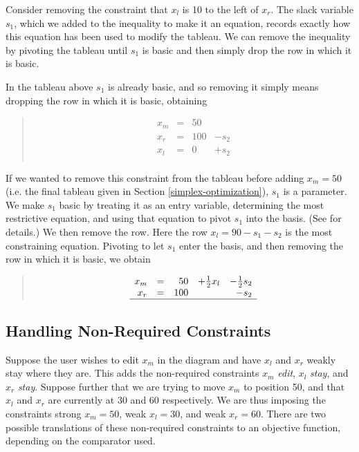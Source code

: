 \documentclass{uist96}
\newcommand{\strength}{\rm}
\begin{document}
Consider removing the constraint that $x_l$ is 10 to the left of $x_r$.
The slack variable $s_1$, which we added to the inequality to make it
an equation, records exactly how this equation has been used to modify the
tableau.  We can remove the inequality by pivoting the tableau until 
$s_1$ is basic and then simply drop the row in which it is basic.

In the tableau above $s_1$ is already basic, and so removing it simply means
dropping the row in which it is basic, obtaining
\begin{quote}\vspace*{-1ex}
$$
\begin{array}{rlrrr} 
x_m & = &50   \\
x_r & = &100 & - s_2 \\ \hline
x_l & = &0 & + s_2 \\

\end{array}
$$
\end{quote}\vspace{-0.9ex}

If we wanted to remove this constraint
from the tableau before adding $x_m = 50$ (i.e. the final tableau given in
Section \ref{simplex-optimization}), $s_1$ is a parameter.
We make $s_1$ basic by treating it as an entry variable,
determining the most restrictive equation, and using that equation
to pivot $s_1$ into the basis.
(See \cite{borning-simplex-tr} for details.)
We then remove the row.  Here
the row $x_l  = 90  - s_1  - s_2$
is the most constraining equation. 
Pivoting to let $s_1$ enter the
basis, and then removing the row in which it is basic, we obtain
\begin{quote}\vspace*{-1ex}
$$
\begin{array}{rlrrr} 
x_m & = &50 & + \frac{1}{2} x_l & - \frac{1}{2} s_2 \\
x_r & = &100 &  & - s_2 \\ \hline
\end{array}
$$
\end{quote}\vspace{-0.9ex}

\subsection{Handling Non-Required Constraints}
\label{non-requireds}

Suppose the user wishes to edit $x_m$ in the diagram and have $x_l$ and
$x_r$ weakly stay where they are.  This adds the non-required constraints
$x_m$ {\em edit}, $x_l$ {\em stay}, and $x_r$ {\em stay}.  Suppose further
that we are trying to move $x_m$ to position 50, and that $x_l$ and $x_r$ are
currently at 30 and 60 respectively.  We are thus imposing the constraints
{\strength strong} $x_m = 50$, {\strength weak} $x_l = 30$, and 
{\strength weak} $x_r = 60$.
There are two possible translations of these non-required constraints
to an objective function, depending on the comparator used.
\end{document}
